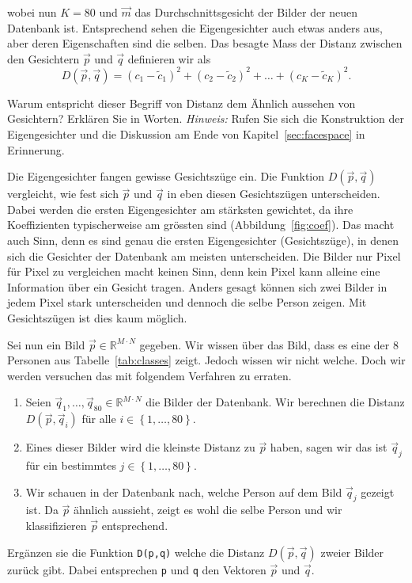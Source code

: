 wobei nun $K=80$ und $\vec m$ das Durchschnittsgesicht der Bilder der neuen Datenbank ist.
Entsprechend sehen die Eigengesichter auch etwas anders aus, aber deren Eigenschaften sind die selben.
Das besagte Mass der Distanz zwischen den Gesichtern $\vec p$ und $\vec q$ definieren wir als
\begin{equation*}
	D\left(\vec p,\vec q\right)=\left(c_1-\tilde c_1\right)^2+\left(c_2-\tilde c_2\right)^2+\ldots+\left(c_K-\tilde c_K\right)^2.
\end{equation*}
\begin{aufgabe}
	Warum entspricht dieser Begriff von Distanz dem \glqq{}Ähnlich aussehen\grqq{} von Gesichtern?
	Erklären Sie in Worten.
	\textit{Hinweis:} Rufen Sie sich die Konstruktion der Eigengesichter und die Diskussion am Ende von Kapitel~\ref{sec:facespace} in Erinnerung.
\end{aufgabe}
\begin{losung*}
	Die Eigengesichter fangen gewisse Gesichtszüge ein.
	Die Funktion $D\left(\vec p,\vec q\right)$ vergleicht, wie fest sich $\vec p$ und $\vec q$ in eben diesen Gesichtszügen unterscheiden.
	Dabei werden die ersten Eigengesichter am stärksten gewichtet, da ihre Koeffizienten typischerweise am grössten sind (Abbildung~\ref{fig:coef}).
	Das macht auch Sinn, denn es sind genau die ersten Eigengesichter (Gesichtszüge), in denen sich die Gesichter der Datenbank am meisten unterscheiden.
	Die Bilder nur Pixel für Pixel zu vergleichen macht keinen Sinn, denn kein Pixel kann alleine eine Information über ein Gesicht tragen.
	Anders gesagt können sich zwei Bilder in jedem Pixel stark unterscheiden und dennoch die selbe Person zeigen.
	Mit Gesichtszügen ist dies kaum möglich.
\end{losung*}
Sei nun ein Bild $\vec p\in\mathbb R^{M\cdot N}$ gegeben.
Wir wissen über das Bild, dass es eine der 8 Personen aus Tabelle~\ref{tab:classes} zeigt.
Jedoch wissen wir nicht welche.
Doch wir werden versuchen das mit folgendem Verfahren zu erraten.
\begin{enumerate}[leftmargin=3cm, label=Schritt \arabic*:]
	\item Seien $\vec q_1,\ldots,\vec q_{80}\in\mathbb R^{M\cdot N}$ die Bilder der Datenbank.
	Wir berechnen die Distanz $D\left(\vec p,\vec q_i\right)$ für alle $i\in\left\{1,\ldots,80\right\}$.
	\item Eines dieser Bilder wird die kleinste Distanz zu $\vec p$ haben, sagen wir das ist $\vec q_j$ für ein bestimmtes $j\in\left\{1,\ldots,80\right\}$.
	\item Wir schauen in der Datenbank nach, welche Person auf dem Bild $\vec q_j$ gezeigt ist. Da $\vec p$ ähnlich aussieht, zeigt es wohl die selbe Person und wir klassifizieren $\vec p$ entsprechend.
\end{enumerate}
\begin{aufgabe}
	Ergänzen sie die Funktion \texttt{D(p,q)} welche die Distanz $D\left(\vec p,\vec q\right)$ zweier Bilder zurück gibt.
	Dabei entsprechen \texttt{p} und \texttt{q} den Vektoren $\vec p$ und $\vec q$.
\end{aufgabe}